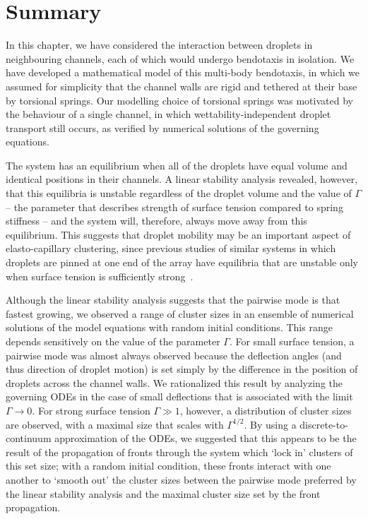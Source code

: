 \section{Summary}
In this chapter, we have considered the interaction between droplets in neighbouring channels, each of which would undergo bendotaxis in isolation. We have developed a mathematical model of this multi-body bendotaxis, in which we assumed for simplicity that the channel walls are rigid and tethered at their base by torsional springs. Our modelling choice of torsional springs was motivated by the behaviour of a single channel, in which wettability-independent droplet transport still occurs, as verified by numerical solutions of the governing equations.

The system has an equilibrium when all of the droplets have equal volume and identical positions in their channels. A linear stability analysis revealed, however, that this equilibria is unstable regardless of the droplet volume and the value of $\Gamma$ --  the parameter that describes strength of surface tension compared to spring stiffness -- and the system will, therefore, always move away from this equilibrium. This suggests that droplet mobility may be an important aspect of elasto-capillary clustering, since previous studies of similar systems in which droplets are pinned at one end of the array have equilibria that are unstable only when surface tension is sufficiently strong~\citep{Singh2014JFM, Hadjittofis2016JFM}. %

Although the linear stability analysis suggests that the pairwise mode is that fastest growing, we observed a range of cluster sizes in an ensemble of numerical solutions of the model equations with random initial conditions. This range depends sensitively  on the value of the parameter $\Gamma$. For small surface tension, a pairwise mode was almost always observed because the deflection angles (and thus direction of droplet motion) is set simply by the difference in the position of droplets across the channel walls. We rationalized this result by analyzing the governing ODEs in the case of small deflections that is associated with the limit $\Gamma \to 0$. For strong surface tension $\Gamma \gg 1$, however, a distribution of cluster sizes are observed, with a maximal size that scales with $\Gamma^{1/2}$. By using a discrete-to-continuum approximation of the ODEs, we suggested that this appears to be the result of the propagation of fronts through the system which `lock in' clusters of this set size; with a random initial condition, these fronts interact with one another to `smooth out' the cluster sizes between the pairwise mode preferred by the linear stability analysis and the maximal cluster size set by the front propagation.

